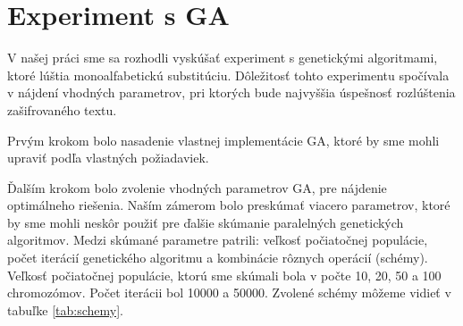 \section{Experiment s GA}
V našej práci sme sa rozhodli vyskúšať experiment s genetickými algoritmami, ktoré lúštia monoalfabetickú substitúciu.
Dôležitosť tohto experimentu spočívala v nájdení vhodných parametrov, pri ktorých bude najvyššia úspešnosť rozlúštenia zašifrovaného textu.

Prvým krokom bolo nasadenie vlastnej implementácie GA, ktoré by sme mohli upraviť podľa vlastných požiadaviek.

Ďalším krokom bolo zvolenie vhodných parametrov GA, pre nájdenie optimálneho riešenia.
Naším zámerom bolo preskúmať viacero parametrov, ktoré by sme mohli neskôr použiť pre ďalšie skúmanie paralelných genetických algoritmov. 
Medzi skúmané parametre patrili: veľkosť počiatočnej populácie, počet iterácií genetického algoritmu a kombinácie rôznych operácií (schémy).
Veľkosť počiatočnej populácie, ktorú sme skúmali bola v počte 10, 20, 50 a 100 chromozómov. Počet iterácii bol 10000 a 50000. 
Zvolené schémy môžeme vidieť v tabuľke \ref{tab:schemy}.

